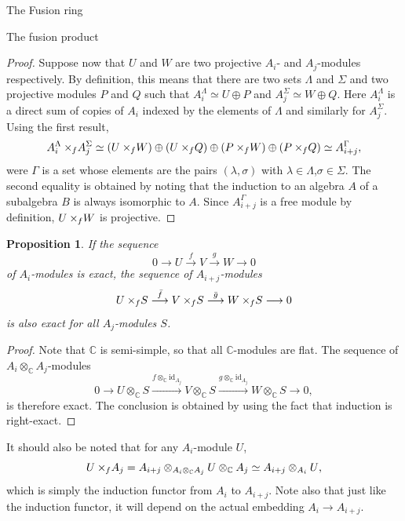 \documentclass[reqno]{amsart}
\newtheorem{Prop}[Thm]{Proposition}
\newcommand{\xf}{\times\hspace{-0.27em}_f}
\begin{document}
\begin{section}{The Fusion ring}
\begin{subsection}{The fusion product}
\begin{proof}
Suppose now that $U$ and $W$ are two projective $A_{i}$- and $A_{j}$-modules respectively. By definition, this means that there are two sets $\Lambda$ and $\Sigma$ and two projective modules $P$ and $Q$ such that $A^{\Lambda}_{i} \simeq U \oplus P$ and $A^{\Sigma}_{j}\simeq W \oplus Q$. Here $A^{\Lambda}_{i}$ is a direct sum of copies of $A_{i}$ indexed by the elements of $\Lambda$ and similarly for $A^{\Sigma}_{j}$. Using the first result,
\begin{equation}
A^{\Lambda}_{i} \xf A^{\Sigma}_{j} \simeq (U \xf W) \oplus (U\xf Q) \oplus (P\xf W) \oplus (P\xf Q) \simeq A^{\Gamma}_{i+j}, 
\end{equation}
were $\Gamma$ is a set whose elements are the pairs $(\lambda, \sigma)$ with $\lambda \in \Lambda$,$\sigma \in \Sigma$. The second equality is obtained by noting that the induction to an algebra $A$ of a subalgebra $B$ is always isomorphic to $A$. Since $A^{\Gamma}_{i+j} $ is a free module by definition, $U\xf W$ is projective.
\end{proof}
\begin{Prop}\label{prop:fusionexact}
If the sequence $$ 0 \longrightarrow U \overset{f}{\longrightarrow} V \overset{g}{\longrightarrow} W \longrightarrow 0$$ of $A_{i}$-modules is exact, the sequence of $A_{i+j}$-modules $$ U\xf S \overset{\bar{f}}{\longrightarrow} V\xf S \overset{\bar{g}}{\longrightarrow} W\xf S \longrightarrow 0$$ is also exact for all $A_{j}$-modules $S$.
\end{Prop}
\begin{proof}
Note that $\mathbb{C}$ is semi-simple, so that all $\mathbb{C}$-modules are flat. The sequence of $A_{i}\otimes_{\mathbb{C}} A_{j}$-modules $$0 \longrightarrow U \otimes_{\mathbb{C}} S \overset{f \otimes_{\mathbb{C}} \text{id}_{A_{j}}}{\longrightarrow} V\otimes_{\mathbb{C}} S \overset{g\otimes_{\mathbb{C}} \text{id}_{A_{j}}}{\longrightarrow} W\otimes_{\mathbb{C}} S \longrightarrow 0 ,$$ is therefore exact. The conclusion is obtained by using the fact that induction is right-exact.
\end{proof}
It should also be noted that for any $A_{i}$-module $U$,
\begin{equation}
U \xf A_{j} = A_{i+j} \otimes_{A_{i}\otimes_{\mathbb{C}} A_{j}} U \otimes_{\mathbb{C}} A_{j} \simeq A_{i+j} \otimes_{A_{i}} U \text{,}
\end{equation}
which is simply the induction functor from $A_{i}$ to $A_{i+j}$. Note also that just like the induction functor, it will depend on the actual embedding $A_{i} \to A_{i+j}$. 

\end{subsection}
\end{section}
\end{document}
